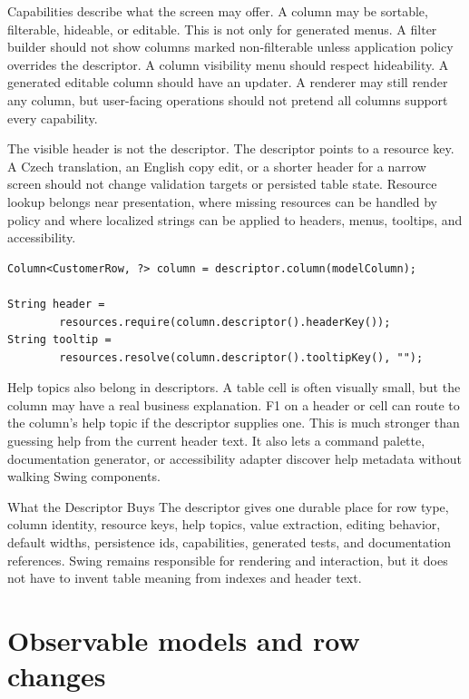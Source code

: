 Capabilities describe what the screen may offer. A column may be sortable,
filterable, hideable, or editable. This is not only for generated menus. A
filter builder should not show columns marked non-filterable unless
application policy overrides the descriptor. A column visibility menu should
respect hideability. A generated editable column should have an updater. A
renderer may still render any column, but user-facing operations should not
pretend all columns support every capability.

The visible header is not the descriptor. The descriptor points to a resource
key. A Czech translation, an English copy edit, or a shorter header for a
narrow screen should not change validation targets or persisted table state.
Resource lookup belongs near presentation, where missing resources can be
handled by policy and where localized strings can be applied to headers,
menus, tooltips, and accessibility.

\begin{lstlisting}[caption={Using descriptor metadata at the Swing edge.}]
Column<CustomerRow, ?> column = descriptor.column(modelColumn);

String header =
        resources.require(column.descriptor().headerKey());
String tooltip =
        resources.resolve(column.descriptor().tooltipKey(), "");
\end{lstlisting}

Help topics also belong in descriptors. A table cell is often visually small,
but the column may have a real business explanation. F1 on a header or cell can
route to the column's help topic if the descriptor supplies one. This is much
stronger than guessing help from the current header text. It also lets a
command palette, documentation generator, or accessibility adapter discover
help metadata without walking Swing components.

\begin{coruscobox}{What the Descriptor Buys}
The descriptor gives one durable place for row type, column identity, resource
keys, help topics, value extraction, editing behavior, default widths,
persistence ids, capabilities, generated tests, and documentation references.
Swing remains responsible for rendering and interaction, but it does not have
to invent table meaning from indexes and header text.
\end{coruscobox}

\section{Observable models and row changes}

